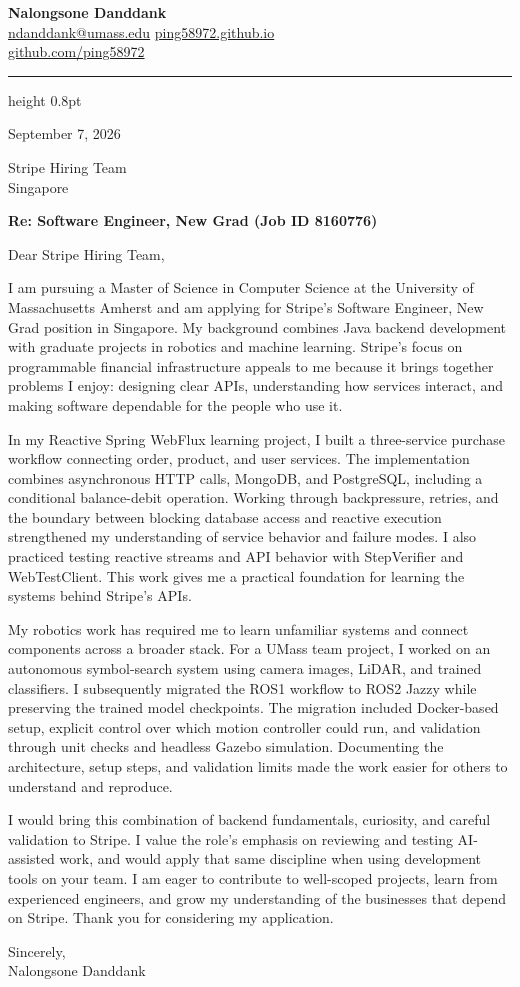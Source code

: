 \documentclass[11pt,a4paper]{article}
\begin{document}
\color{ink}
{\LARGE\bfseries Nalongsone Danddank}\\[6pt]
\href{mailto:ndanddank@umass.edu}{ndanddank@umass.edu}\quad\textbar\quad
\href{https://ping58972.github.io/}{ping58972.github.io}\\[3pt]
\href{https://github.com/ping58972}{github.com/ping58972}
\par\vspace{-0.3em}
{\color{accent}\hrule height 0.8pt}
\vspace{0.7em}
September 7, 2026

Stripe Hiring Team\\
Singapore

\textbf{Re: Software Engineer, New Grad (Job ID 8160776)}

Dear Stripe Hiring Team,

I am pursuing a Master of Science in Computer Science at the University of Massachusetts Amherst and am applying for Stripe's Software Engineer, New Grad position in Singapore. My background combines Java backend development with graduate projects in robotics and machine learning. Stripe's focus on programmable financial infrastructure appeals to me because it brings together problems I enjoy: designing clear APIs, understanding how services interact, and making software dependable for the people who use it.

In my Reactive Spring WebFlux learning project, I built a three-service purchase workflow connecting order, product, and user services. The implementation combines asynchronous HTTP calls, MongoDB, and PostgreSQL, including a conditional balance-debit operation. Working through backpressure, retries, and the boundary between blocking database access and reactive execution strengthened my understanding of service behavior and failure modes. I also practiced testing reactive streams and API behavior with StepVerifier and WebTestClient. This work gives me a practical foundation for learning the systems behind Stripe's APIs.

My robotics work has required me to learn unfamiliar systems and connect components across a broader stack. For a UMass team project, I worked on an autonomous symbol-search system using camera images, LiDAR, and trained classifiers. I subsequently migrated the ROS1 workflow to ROS2 Jazzy while preserving the trained model checkpoints. The migration included Docker-based setup, explicit control over which motion controller could run, and validation through unit checks and headless Gazebo simulation. Documenting the architecture, setup steps, and validation limits made the work easier for others to understand and reproduce.

I would bring this combination of backend fundamentals, curiosity, and careful validation to Stripe. I value the role's emphasis on reviewing and testing AI-assisted work, and would apply that same discipline when using development tools on your team. I am eager to contribute to well-scoped projects, learn from experienced engineers, and grow my understanding of the businesses that depend on Stripe. Thank you for considering my application.

Sincerely,\\[5pt]
Nalongsone Danddank
\end{document}
